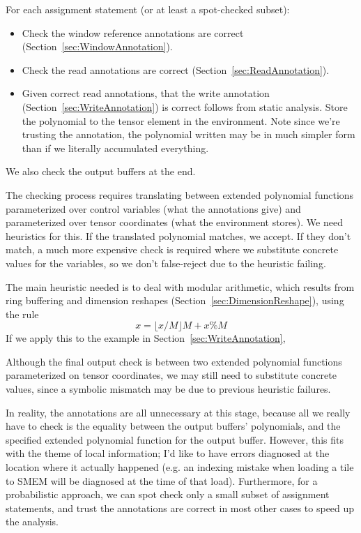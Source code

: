 
For each assignment statement (or at least a spot-checked subset):
\begin{itemize}
  \item Check the window reference annotations are correct (Section~\ref{sec:WindowAnnotation}).
  \item Check the read annotations are correct (Section~\ref{sec:ReadAnnotation}).
  \item Given correct read annotations, that the write annotation (Section~\ref{sec:WriteAnnotation}) is correct follows from static analysis.
    Store the polynomial to the tensor element in the environment.
    Note since we're trusting the annotation, the polynomial written may be in much simpler form than if we literally accumulated everything.
\end{itemize}
We also check the output buffers at the end.


The checking process requires translating between extended polynomial functions parameterized over control variables (what the annotations give) and parameterized over tensor coordinates (what the environment stores).
We need heuristics for this.
If the translated polynomial matches, we accept.
If they don't match, a much more expensive check is required where we substitute concrete values for the variables, so we don't false-reject due to the heuristic failing.

The main heuristic needed is to deal with modular arithmetic, which results from ring buffering and dimension reshapes (Section~\ref{sec:DimensionReshape}), using the rule
\begin{equation*}
    x = \lfloor x / M \rfloor M + x \% M
\end{equation*}
If we apply this to the example in Section~\ref{sec:WriteAnnotation},



Although the final output check is between two extended polynomial functions parameterized on tensor coordinates, we may still need to substitute concrete values, since a symbolic mismatch may be due to previous heuristic failures.


In reality, the annotations are all unnecessary at this stage, because all we really have to check is the equality between the output buffers' polynomials, and the specified extended polynomial function for the output buffer.
However, this fits with the theme of local information; I'd like to have errors diagnosed at the location where it actually happened (e.g. an indexing mistake when loading a tile to SMEM will be diagnosed at the time of that load).
Furthermore, for a probabilistic approach, we can spot check only a small subset of assignment statements, and trust the annotations are correct in most other cases to speed up the analysis.

